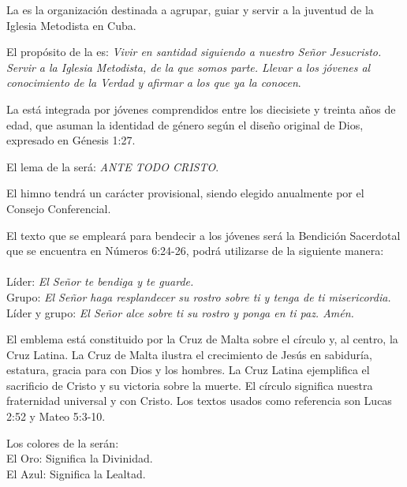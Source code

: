 

\article
\label{definicion-liga}
La \LMJ{} es la organización destinada a agrupar, guiar y servir a la juventud de la Iglesia Metodista en Cuba.

\article
\label{proposito-liga}
El propósito de la \LMJ{} es: \emph{Vivir en santidad siguiendo a nuestro Señor Jesucristo. Servir a la Iglesia Metodista, de la que somos parte. Llevar a los jóvenes al conocimiento de la Verdad y afirmar a los que ya la conocen}.

\article
\label{composicion-liga}
La \LMJ{} está integrada por jóvenes comprendidos entre los diecisiete y treinta años de edad, que asuman la identidad de género según el diseño original de Dios, expresado en Génesis 1:27.

\article
El lema de la \LMJ{} será: \emph{ANTE TODO CRISTO}.

\article
El himno tendrá un carácter provisional, siendo elegido anualmente por el Consejo Conferencial.

\article
\label{texto-liga}
El texto que se empleará para bendecir a los jóvenes será la Bendición Sacerdotal que se encuentra en Números 6:24-26, podrá utilizarse de la siguiente manera:\\ \\
Líder: \emph{El Señor te bendiga y te guarde.}\\
Grupo: \emph{El Señor haga resplandecer su rostro sobre ti y tenga de ti misericordia.}\\
Líder y grupo: \emph{El Señor alce sobre ti su rostro y ponga en ti paz. Amén.}

\article
\label{emblema-liga}
El emblema está constituido por la Cruz de Malta sobre el círculo y, al centro, la Cruz Latina. La Cruz de Malta ilustra el crecimiento de Jesús en sabiduría, estatura, gracia para con Dios y los hombres. La Cruz Latina ejemplifica el sacrificio de Cristo y su victoria sobre la muerte. El círculo significa nuestra fraternidad universal y con Cristo. Los textos usados como referencia son Lucas 2:52 y Mateo 5:3-10.

\article
Los colores de la \LMJ{} serán:\\
El Oro: Significa la Divinidad.\\
El Azul: Significa la Lealtad.
